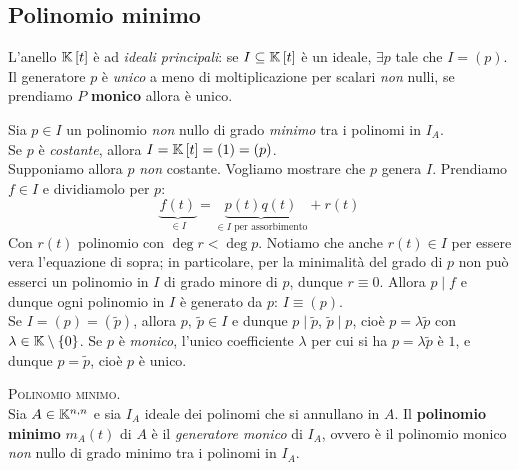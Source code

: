 \subsection{Polinomio minimo}
\begin{proposition}
	L'anello $\mathbb{K}\left[t\right]$ è ad \textit{ideali principali}: se $I\subseteq \mathbb{K}\left[t\right]$ è un ideale, $\exists p$ tale che $I=\left(p\right)$. Il generatore $p$ è \textit{unico} a meno di moltiplicazione per scalari \textit{non} nulli, se prendiamo $P$ \textbf{monico} allora è unico.
\end{proposition}
\begin{demonstration}
Sia $p\in I$ un polinomio \textit{non} nullo di grado \textit{minimo} tra i polinomi in $I_A$.\\
Se $p$ è \textit{costante}, allora $I=\mathbb{K}\left[t\right]=\left(1\right)=\left(p\right)$.\\
Supponiamo allora $p$ \textit{non} costante. Vogliamo mostrare che $p$ genera $I$.
Prendiamo $f\in I$ e dividiamolo per $p$:
\begin{equation*}
	\underbrace{f\left(t\right)}_{\in I}=\underbrace{p\left(t\right)q\left(t\right)}_{\in I\text{ per assorbimento}}+r\left(t\right)
\end{equation*}
Con $r\left(t\right)$ polinomio con $\deg r < \deg p$. Notiamo che anche $r\left(t\right)\in I$ per essere vera l'equazione di sopra; in particolare, per la minimalità del grado di $p$ non può esserci un polinomio in $I$ di grado minore di $p$, dunque $r\equiv 0$. Allora $p\mid f$ e dunque ogni polinomio in $I$ è generato da $p$: $I\equiv\left(p\right)$.\\
Se $I=\left(p\right)=\left(\widetilde{p}\right)$, allora $p,\ \widetilde{p}\in I$ e dunque $p\mid \widetilde{p}$, $\widetilde{p}\mid p$, cioè $p=\lambda\widetilde{p}$ con $\lambda\in\mathbb{K}\setminus\left\{0\right\}$. Se $p$ è \textit{monico}, l'unico coefficiente $\lambda$ per cui si ha $p=\lambda\widetilde{p}$ è $1$, e dunque $p=\widetilde{p}$, cioè $p$ è unico.
\end{demonstration}
\begin{define}\textsc{Polinomio minimo.}\\
	Sia $A\in\mathbb{K}^{n, n}$ e sia $I_A$ ideale dei polinomi che si annullano in $A$. Il \textbf{polinomio minimo} $m_A\left(t\right)$ di $A$ è il  \textit{generatore monico} di $I_A$, ovvero è il polinomio monico \textit{non} nullo di grado minimo tra i polinomi in $I_A$.
\end{define}
